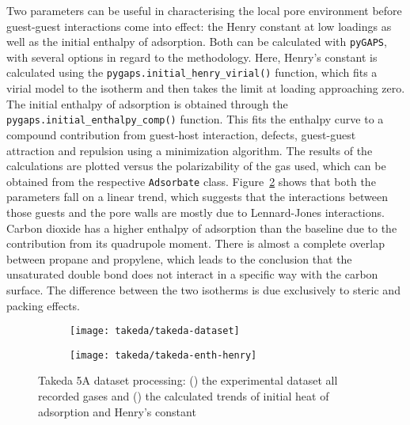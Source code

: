 Two parameters can be useful in characterising the local pore environment
before guest-guest interactions come into effect: the Henry constant at
low loadings as well as the initial enthalpy of adsorption. Both can
be calculated with \texttt{pyGAPS}, with several options in
regard to the methodology. Here, Henry's constant is calculated using the
\lstinline{pygaps.initial_henry_virial()} function, which fits a virial model to
the isotherm and then takes the limit at loading approaching zero. The initial enthalpy of
adsorption is obtained through the \lstinline{pygaps.initial_enthalpy_comp()} function.
This fits the enthalpy curve to a compound contribution from
guest-host interaction, defects, guest-guest attraction and repulsion using a minimization
algorithm. The results of the calculations are plotted versus the polarizability of the
gas used, which can be obtained from the respective \texttt{Adsorbate} class.
Figure~\ref{fgr:takedatrends} shows that both the parameters fall on a linear
trend, which suggests that the interactions between those guests and the pore walls are
mostly due to Lennard-Jones interactions. Carbon dioxide has a higher enthalpy
of adsorption than the baseline due to the contribution from its quadrupole moment.
There is almost a complete overlap between propane and propylene, which leads to
the conclusion that the unsaturated double bond does not interact in a specific way
with the carbon surface.
The difference between the two isotherms is due exclusively to steric and packing effects.

\begin{figure}[ht]

	\centering
	\begin{subfigure}[b]{.5\textwidth}
		\centering
		\texttt{[image: takeda/takeda-dataset]}
		\caption{}%
		\label{fgr:takedadataset}
	\end{subfigure}%
	\begin{subfigure}[b]{.5\textwidth}
		\centering
		\texttt{[image: takeda/takeda-enth-henry]}
		\caption{}%
		\label{fgr:takedatrends}
	\end{subfigure}
	\caption{Takeda 5A dataset processing: (\protect{}) the
		experimental dataset all recorded gases and (\protect{}) the calculated
		trends of initial heat of adsorption and Henry's constant}%
	\label{fgr:takedaanalysis}

\end{figure}


